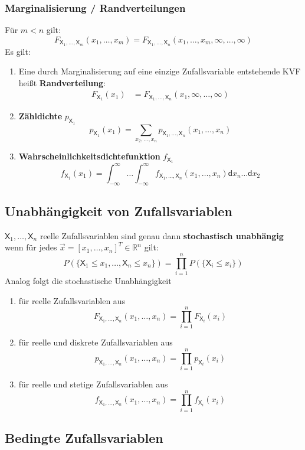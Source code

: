 \documentclass[a4paper,twocolumn,10pt]{article}
\newenvironment{abc}{\begin{enumerate}[label={\alph*)}]}{\end{enumerate}}
\begin{document}
\subsubsection{Marginalisierung / Randverteilungen}
Für $m < n$ gilt:
\[F_{\mathsf X_1,\dots,\mathsf X_m}(x_1,\dots,x_m)=F_{\mathsf X_1,\dots,\mathsf X_n}(x_1,\dots,x_m,\infty,\dots,\infty)\]
Es gilt:
\begin{abc}
\item Eine durch Marginalisierung auf eine einzige Zufallsvariable entstehende KVF heißt \textbf{Randverteilung}:
\[\begin{split} F_{\mathsf X_1}(x_1) &=F_{\mathsf X_1,\dots,\mathsf X_n}(x_1,\infty,\dots,\infty)\end{split}\]

\item \textbf{Zähldichte} $p_{\mathsf X_1}$
\[p_{\mathsf X_1}(x_1) = \sum_{x_2,\dots,x_n}p_{\mathsf X_1,\dots,\mathsf X_n}(x_1,\dots,x_n)\]

\item \textbf{Wahrscheinlichkeitsdichtefunktion}  $f_{\mathsf X_1}$
\[f_{\mathsf X_1}(x_1) = \int_{-\infty}^{\infty}\dots\int_{-\infty}^{\infty}f_{\mathsf X_1,\dots,\mathsf X_n}(x_1,\dots,x_n)\mathsf dx_n\dots\mathsf dx_2\]
\end{abc}

\subsection{Unabhängigkeit von Zufallsvariablen}
$\mathsf X_1,\dots,\mathsf X_n$ reelle Zufallsvariablen sind genau dann \textbf{stochastisch unabhängig} wenn für jedes $\vec x = [x_1,\dots,x_n]^T \in \mathbb R^n$ gilt: \[P(\{\mathsf X_1 \leq x_1,\dots,\mathsf X_n \leq x_n\}) = \prod_{i=1}^nP(\{\mathsf X_i \leq x_i\})\]Analog folgt die stochastische Unabhängigkeit 
\begin{abc}
\item für reelle Zufallsvariablen aus \[F_{\mathsf X_1,\dots,\mathsf X_n}(x_1,\dots,x_n) = \prod_{i=1}^nF_{\mathsf X_i}(x_i)\]
\item für reelle und diskrete Zufallsvariablen aus \[p_{\mathsf X_1,\dots,\mathsf X_n}(x_1,\dots,x_n) = \prod_{i=1}^np_{\mathsf X_i}(x_i)\]
\item für reelle und stetige Zufallsvariablen aus\[f_{\mathsf X_1,\dots,\mathsf X_n}(x_1,\dots,x_n) = \prod_{i=1}^nf_{\mathsf X_i}(x_i)\]
\end{abc}

\subsection{Bedingte Zufallsvariablen}
\end{document}
